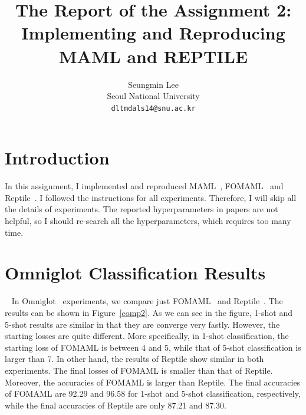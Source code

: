 \documentclass[final]{cvpr}
\begin{document}
\title{The Report of the Assignment 2:\\Implementing and Reproducing MAML and REPTILE}

\author{Seungmin Lee\\
Seoul National University\\
{\tt\small dltmdals14@snu.ac.kr}
}

\onecolumn
\maketitle


\section{Introduction}
In this assignment, I implemented and reproduced MAML~\cite{maml}, FOMAML~\cite{maml} and Reptile~\cite{reptile}. I followed the instructions for all experiments. Therefore, I will skip all the details of experiments. The reported hyperparameters in papers are not helpful, so I should re-search all the hyperparameters, which requires too many time. 

\section{Omniglot Classification Results}~\label{omniglot}
In Omniglot~\cite{omniglot} experiments, we compare just FOMAML~\cite{maml} and Reptile~\cite{reptile}. The results can be shown in Figure~\ref{comp2}. As we can see in the figure, 1-shot and 5-shot results are similar in that they are converge very fastly. However, the starting losses are quite different. More specifically, in 1-shot classification, the starting loss of FOMAML is between 4 and 5, while that of 5-shot classification is larger than 7. In other hand, the results of Reptile show similar in both experiments. The final losses of FOMAML is smaller than that of Reptile. Moreover, the accuracies of FOMAML is larger than Reptile. The final accuracies of FOMAML are 92.29 and 96.58 for 1-shot and 5-shot classification, respectively, while the final accuracies of Reptile are only 87.21 and 87.30.
\end{document}
